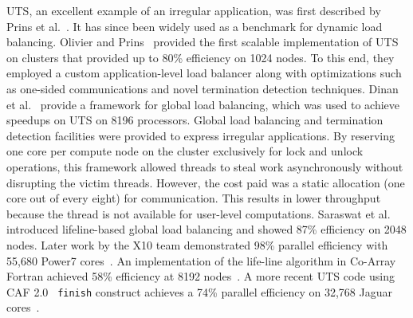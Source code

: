 UTS, an excellent example of an irregular application, was first described by
Prins et al.~\cite{prins:03}.  It has since been widely used as a
benchmark for dynamic load balancing. 
%
Olivier and Prins~\cite{olivier:08} provided the first scalable implementation
of UTS on clusters that provided up to 80\% efficiency on 1024 nodes.
%
To this end, they employed a custom application-level load balancer along with
optimizations such as one-sided communications and novel termination detection
techniques.
% 
Dinan et al.~\cite{dinan:09} provide a framework for
global load balancing, which was used to achieve speedups on UTS on 8196
processors. Global load balancing and termination detection facilities
were provided to express irregular applications.
%
By reserving one core per compute node on the cluster exclusively for lock and
unlock operations, this framework allowed threads to steal work asynchronously
without disrupting the victim threads. However, the cost paid was a static
allocation (one core out of every eight) for communication. This results in
lower throughput because the thread is not available for user-level
computations.
% 
Saraswat et al.~\cite{glb} introduced lifeline-based global load
balancing and showed 87\% efficiency on 2048 nodes. Later work by the
X10 team demonstrated 98\% parallel efficiency with 55,680 Power7
cores~\cite{tardieu-petascale}.  An implementation of the life-line
algorithm in Co-Array Fortran achieved 58\% efficiency at 8192
nodes~\cite{CAF-HPCC2011}. A more recent UTS code using CAF 2.0 {\tt
  finish} construct achieves a 74\% parallel efficiency on 32,768
Jaguar cores~\cite{Chaoran:2013}.

%


